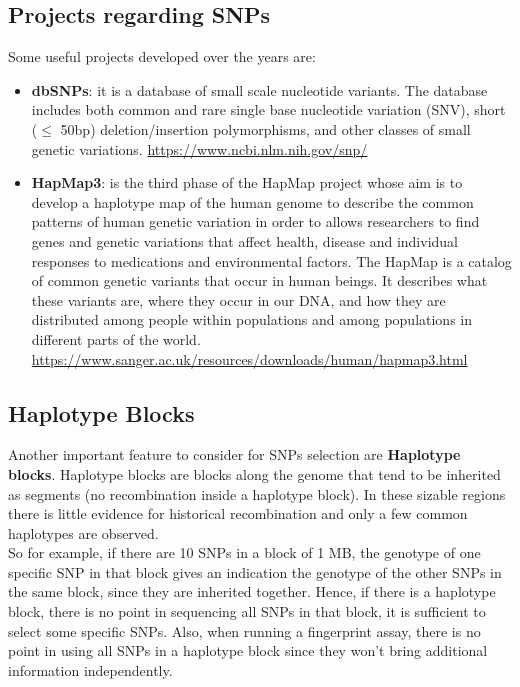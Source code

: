 \subsection{Projects regarding SNPs}
Some useful projects developed over the years are:
\begin{itemize}
	\item \textbf{dbSNPs}: it is a database of small scale nucleotide variants. The database includes both common and rare single base nucleotide variation (SNV), short ($\leq$ 50bp) deletion/insertion polymorphisms, and other classes of small genetic variations.
	\url{https://www.ncbi.nlm.nih.gov/snp/}

	\item \textbf{HapMap3}: is the third phase of the HapMap project whose aim is to develop a haplotype map of the human genome to describe the common patterns of human genetic variation in order to allows researchers to find genes and genetic variations that affect health, disease and individual responses to medications and environmental factors. The HapMap is a catalog of common genetic variants that occur in human beings. It describes what these variants are, where they occur in our DNA, and how they are distributed among people within populations and among populations in different parts of the world.
	\url{https://www.sanger.ac.uk/resources/downloads/human/hapmap3.html}
\end{itemize}

\subsection{Haplotype Blocks}

Another important feature to consider for SNPs selection are \textbf{Haplotype blocks}. Haplotype blocks are blocks along the genome that tend to be inherited as segments (no recombination inside a haplotype block). In these sizable regions there is little evidence for historical recombination and only a few common haplotypes are observed. \\

So for example, if there are 10 SNPs in a block of 1 MB, the genotype of one specific SNP in that block gives an indication the genotype of the other SNPs in the same block, since they are inherited together.
Hence, if there is a haplotype block, there is no point in sequencing all SNPs in that block, it is sufficient to select some specific SNPs. Also, when running a fingerprint assay, there is no point in using all SNPs in a haplotype block since they won't bring additional information independently.\\

